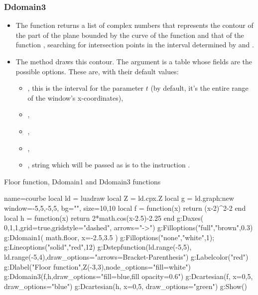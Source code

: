 \subsubsection{Ddomain3}

\begin{itemize}
    \item The  function returns a list of complex numbers that represents the contour of the part of the plane bounded by the curve of the function  and that of the function , searching for intersection points in the interval determined by  and .

    \item The  method draws this contour. The argument  is a table whose fields are the possible options. These are, with their default values:

    \begin{itemize}
        \item {}, this is the interval for the parameter $t$ (by default, it's the entire range of the window's x-coordinates),
        \item {}, 
        \item {},
        \item {},
        \item {}, string which will be passed as is to the instruction \drawcmd.
\end{itemize}
\end{itemize}

\begin{demo}{Floor function, Ddomain1 and Ddomain3 functions}
\begin{luadraw}{name=courbe}
local ld = luadraw
local Z = ld.cpx.Z
local g = ld.graph:new{ window={-5,5,-5,5}, bg="", size={10,10} }
local f = function(x) return (x-2)^2-2 end
local h = function(x) return 2*math.cos(x-2.5)-2.25 end
g:Daxes( {0,1,1},{grid=true,gridstyle="dashed", arrows="->"})
g:Filloptions("full","brown",0.3)
g:Ddomain1( math.floor, { x={-2.5,3.5} })
g:Filloptions("none","white",1); g:Lineoptions("solid","red",12)
g:Dstepfunction({ld.range(-5,5), ld.range(-5,4)},{draw_options="arrows={Bracket-Parenthesis}"})
g:Labelcolor("red")
g:Dlabel("Floor function",Z(-3,3),{node_options="fill=white"})
g:Ddomain3(f,h,{draw_options="fill=blue,fill opacity=0.6"})
g:Dcartesian(f, {x={0,5}, draw_options="blue"})
g:Dcartesian(h, {x={0,5}, draw_options="green"})
g:Show()
\end{luadraw}
\end{demo}

